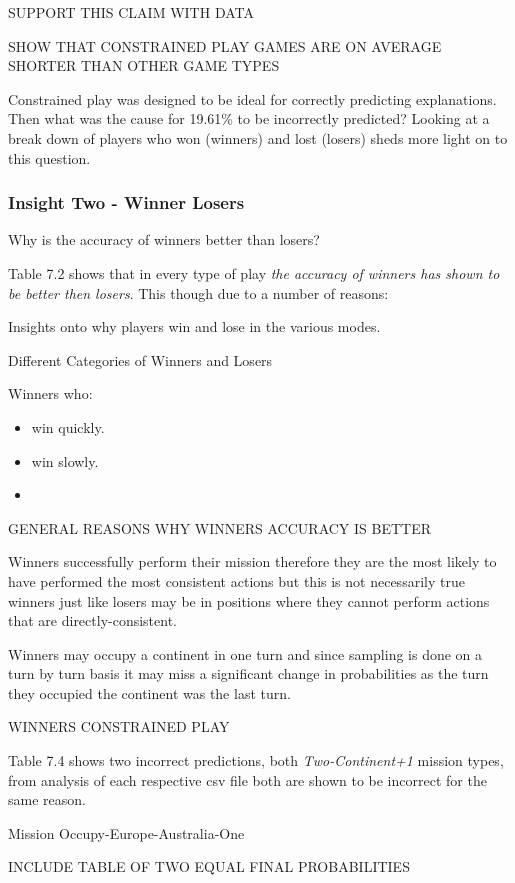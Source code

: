 \documentclass[parskip]{cs4rep}
\begin{document}
SUPPORT THIS CLAIM WITH DATA

SHOW THAT CONSTRAINED PLAY GAMES ARE ON AVERAGE SHORTER THAN OTHER GAME TYPES

Constrained play was designed to be ideal for correctly predicting explanations. Then what was the cause for 19.61\% to be incorrectly predicted? Looking at a break down of players who won (winners) and lost (losers) sheds more light on to this question. 

\subsubsection{Insight Two - Winner Losers}

Why is the accuracy of winners better than losers?

Table 7.2 shows that in every type of play \textit{the accuracy of winners has shown to be better then losers}. This though due to a number of reasons:

Insights onto why players win and lose in the various modes.

Different Categories of Winners and Losers

Winners who:

\begin{itemize}
\item
win quickly.
\item
win slowly.
\item
\end{itemize}

GENERAL REASONS WHY WINNERS ACCURACY IS BETTER

Winners successfully perform their mission therefore they are the most likely to have performed the most consistent actions but this is not necessarily true  winners just like losers may be in positions where they cannot perform actions that are directly-consistent.

Winners may occupy a continent in one turn and since sampling is done on a turn by turn basis it may miss a significant change in probabilities as the turn they occupied the continent was the last turn.

WINNERS CONSTRAINED PLAY

Table 7.4 shows two incorrect predictions, both \textit{Two-Continent+1} mission types, from analysis of each respective csv file both are shown to be incorrect for the same reason. 

Mission Occupy-Europe-Australia-One

INCLUDE TABLE OF TWO EQUAL FINAL PROBABILITIES
\end{document}
